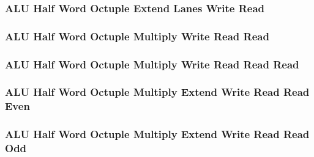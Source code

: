 \subsubsection[{\small ALU Half Word Octuple Extend Lanes Write Read}]{ALU Half Word Octuple Extend Lanes Write Read} \label{sec:format-ALU-HOEXTLWR}



\subsubsection[{\small ALU Half Word Octuple Multiply Write Read Read}]{ALU Half Word Octuple Multiply Write Read Read} \label{sec:format-ALU-HOMWRR}



\subsubsection[{\small ALU Half Word Octuple Multiply Write Read Read Read}]{ALU Half Word Octuple Multiply Write Read Read Read} \label{sec:format-ALU-HOMWRRR}



\subsubsection[{\small ALU Half Word Octuple Multiply Extend Write Read Read Even}]{ALU Half Word Octuple Multiply Extend Write Read Read Even} \label{sec:format-ALU-HOMEWRRE}



\subsubsection[{\small ALU Half Word Octuple Multiply Extend Write Read Read Odd}]{ALU Half Word Octuple Multiply Extend Write Read Read Odd} \label{sec:format-ALU-HOMEWRRO}



